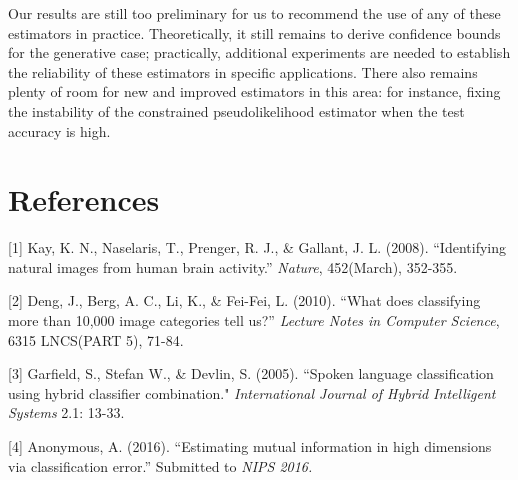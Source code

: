 \documentclass{article}
\begin{document}
Our results are still too preliminary for us to recommend the use of any of these estimators in practice.
Theoretically, it still remains to derive confidence bounds for the generative case;
practically, additional experiments are needed to establish the reliability of these estimators
in specific applications.  There also remains plenty of room for new and improved estimators in this area:
for instance, fixing the instability of the constrained pseudolikelihood estimator when the test accuracy is high.




\newpage
\section*{References}

\small

[1] Kay, K. N., Naselaris, T., Prenger, R. J., \& Gallant, J. L. (2008). ``Identifying natural images from human brain activity.'' 
\emph{Nature}, 452(March), 352-355.

[2] Deng, J., Berg, A. C., Li, K., \& Fei-Fei, L. (2010). ``What does classifying more than 10,000 image categories tell us?'' \emph{Lecture Notes in Computer Science}, 6315 LNCS(PART 5), 71-84. 

[3] Garfield, S., Stefan W., \& Devlin, S. (2005). ``Spoken language classification using hybrid classifier combination." 
\emph{International Journal of Hybrid Intelligent Systems} 2.1: 13-33.

[4] Anonymous, A. (2016). ``Estimating mutual information in high dimensions via classification error.''  Submitted to 
\emph{NIPS 2016.}
\end{document}
